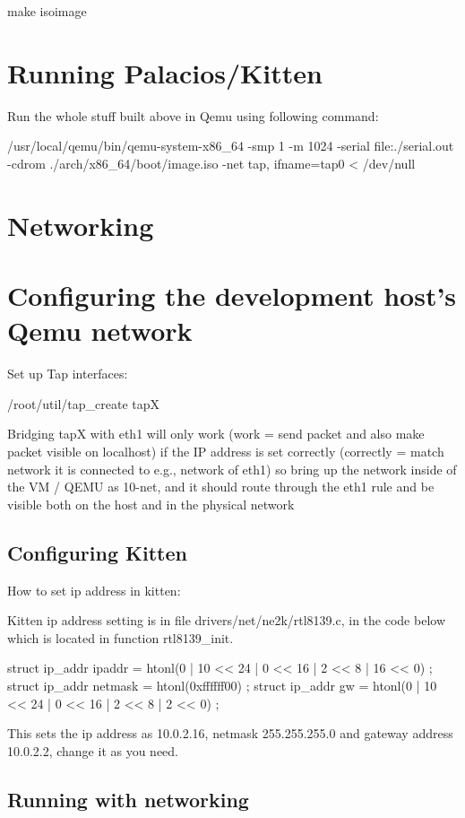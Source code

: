 \documentclass[11pt]{article}
\begin{document}
make  isoimage

\section{Running Palacios/Kitten}
Run the whole stuff built above in Qemu using following command: 

/usr/local/qemu/bin/qemu-system-x86\_64 -smp 1 -m 1024 -serial file:./serial.out -cdrom ./arch/x86\_64/boot/image.iso  -net tap, ifname=tap0  < /dev/null


\section{Networking}

\section{Configuring the development host's Qemu network}
Set up Tap interfaces:

/root/util/tap\_create tapX

Bridging tapX with eth1 will only work (work = send packet and also make packet visible on localhost) if the IP address is set correctly (correctly = match network it is connected to  e.g., network of eth1)  so bring up the network inside of the VM / QEMU as 10-net, and it should route through the eth1 rule and be visible both on the host and in the physical network


\subsection{Configuring Kitten}

How to set ip address in kitten:

Kitten ip address setting is in file drivers/net/ne2k/rtl8139.c, in the code below which is located in function rtl8139\_init.

  struct ip\_addr ipaddr = { htonl(0 | 10 << 24 | 0 << 16 | 2 << 8 | 16 << 0) }; 
  struct ip\_addr netmask = { htonl(0xffffff00) }; 
  struct ip\_addr gw = { htonl(0 | 10 << 24 | 0 << 16 | 2 << 8 | 2 << 0) };

This sets the ip address as 10.0.2.16, netmask 255.255.255.0 and gateway address 10.0.2.2, change it as you need.



\subsection{Running with networking}
\end{document}
